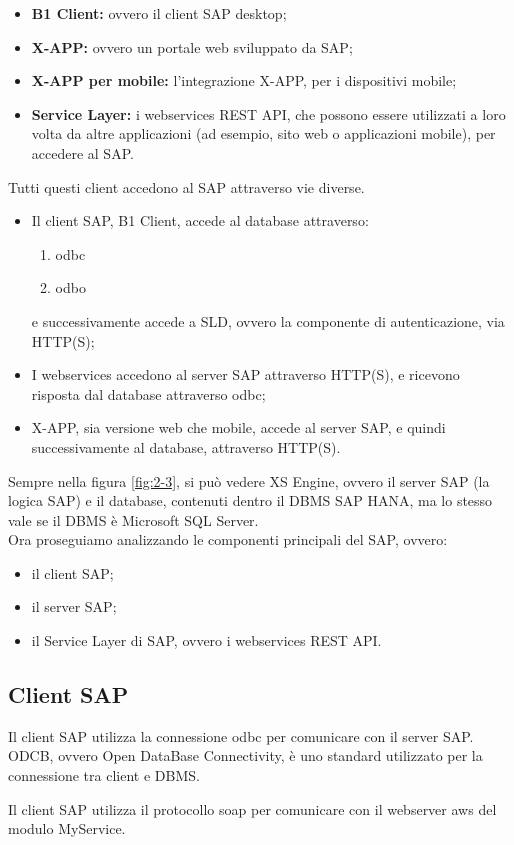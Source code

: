 \begin{itemize}
	\item \textbf{B1 Client:} ovvero il client SAP desktop;
	\item \textbf{X-APP:} ovvero un portale web sviluppato da SAP;
	\item \textbf{X-APP per mobile:} l'integrazione X-APP, per i dispositivi mobile;
	\item \textbf{Service Layer:} i webservices REST API, che possono essere utilizzati a loro volta da altre applicazioni (ad esempio, sito web o applicazioni mobile), per accedere al SAP.
\end{itemize}
Tutti questi client accedono al SAP attraverso vie diverse.
\begin{itemize}
		\item Il client SAP, B1 Client, accede al database attraverso:
		\begin{enumerate}
			\item \gls{odbc} 
			\item \gls{odbo}
		\end{enumerate}
		e successivamente accede a SLD, ovvero la componente di autenticazione, via HTTP(S);
\item I webservices accedono al server SAP attraverso HTTP(S), e ricevono risposta dal database attraverso \gls{odbc};
	\item X-APP, sia versione web che mobile, accede al server SAP, e quindi successivamente al database, attraverso HTTP(S).
\end{itemize}
Sempre nella figura \ref{fig:2-3}, si può vedere XS Engine, ovvero il server SAP (la logica SAP) e il database, contenuti dentro il DBMS SAP HANA, ma lo stesso vale se il DBMS è Microsoft SQL Server.\\
Ora proseguiamo analizzando le componenti principali del SAP, ovvero:
\begin{itemize}
	\item il client SAP;
	\item il server SAP;
	\item il Service Layer di SAP, ovvero i webservices REST API.
\end{itemize}
\newpage
\subsection{Client SAP}

	\item Il client SAP utilizza la connessione \gls{odbc} per comunicare con il server SAP.\\ODCB, ovvero Open DataBase Connectivity, è uno standard utilizzato per la connessione tra client e DBMS. 
	\item Il client SAP utilizza il protocollo \gls{soap} per comunicare con il webserver \gls{aws} del modulo MyService.

